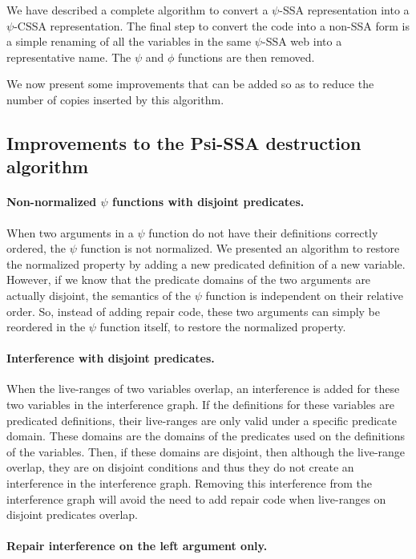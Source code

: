 We have described a complete algorithm to convert a $\psi$-SSA
representation into a $\psi$-CSSA representation. The final step to
convert the code into a non-SSA form is a simple renaming of all the
variables in the same $\psi$-SSA web into a representative name. The
$\psi$ and $\phi$ functions are then removed.

We now present some improvements that can be added so as to reduce
the number of copies inserted by this algorithm.

\subsection{Improvements to the Psi-SSA destruction algorithm}

\paragraph{Non-normalized $\psi$ functions with disjoint predicates.}
When two arguments in a $\psi$ function do not have their definitions
correctly ordered, the $\psi$ function is not normalized. We
presented an algorithm to restore the normalized property by adding a
new predicated definition of a new variable. However, if we know that
the predicate domains of the two arguments are actually disjoint, the
semantics of the $\psi$ function is independent on their relative
order. So, instead of adding repair code, these two arguments can
simply be reordered in the $\psi$ function itself, to restore the
normalized property.

\paragraph{Interference with disjoint predicates.}
When the live-ranges of two variables overlap, an interference is
added for these two variables in the interference graph. If the
definitions for these variables are predicated definitions, their
live-ranges are only valid under a specific predicate domain. These
domains are the domains of the predicates used on the definitions of
the variables. Then, if these domains are disjoint, then although the
live-range overlap, they are on disjoint conditions and thus they do
not create an interference in the interference graph. Removing this
interference from the interference graph will avoid the need to add repair code
when live-ranges on disjoint predicates overlap.

\paragraph{Repair interference on the left argument only.}

